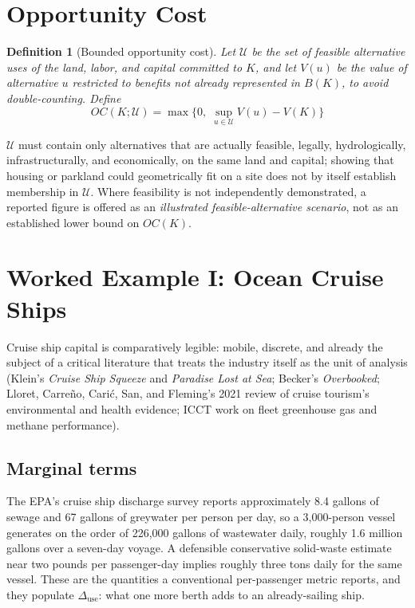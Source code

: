 \documentclass[11pt]{article}
\newtheorem{definition}{Definition}[section]
\begin{document}
\section{Opportunity Cost}

\begin{definition}[Bounded opportunity cost]
Let $\mathcal{U}$ be the set of feasible alternative uses of the land, labor, and capital committed to $K$, and let $V(u)$ be the value of alternative $u$ restricted to benefits not already represented in $B(K)$, to avoid double-counting. Define
\[
OC(K;\mathcal{U}) = \max\Big\{0,\; \sup_{u \in \mathcal{U}} V(u) - V(K)\Big\}
\]
\end{definition}

$\mathcal{U}$ must contain only alternatives that are actually feasible, legally, hydrologically, infrastructurally, and economically, on the same land and capital; showing that housing or parkland could geometrically fit on a site does not by itself establish membership in $\mathcal{U}$. Where feasibility is not independently demonstrated, a reported figure is offered as an \emph{illustrated feasible-alternative scenario}, not as an established lower bound on $OC(K)$.

\section{Worked Example I: Ocean Cruise Ships}

Cruise ship capital is comparatively legible: mobile, discrete, and already the subject of a critical literature that treats the industry itself as the unit of analysis (Klein's \emph{Cruise Ship Squeeze} and \emph{Paradise Lost at Sea}; Becker's \emph{Overbooked}; Lloret, Carre\~no, Cari\'c, San, and Fleming's 2021 review of cruise tourism's environmental and health evidence; ICCT work on fleet greenhouse gas and methane performance).

\subsection{Marginal terms}

The EPA's cruise ship discharge survey reports approximately 8.4 gallons of sewage and 67 gallons of greywater per person per day, so a 3{,}000-person vessel generates on the order of 226{,}000 gallons of wastewater daily, roughly 1.6 million gallons over a seven-day voyage. A defensible conservative solid-waste estimate near two pounds per passenger-day implies roughly three tons daily for the same vessel. These are the quantities a conventional per-passenger metric reports, and they populate $\Delta_{\text{use}}$: what one more berth adds to an already-sailing ship.
\end{document}
